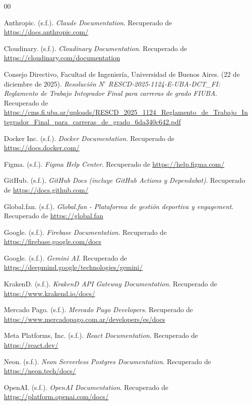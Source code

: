 \documentclass[conference, a4paper]{IEEEtran}
\begin{document}
\begin{thebibliography}{00}

 Anthropic. (s.f.). \textit{Claude Documentation}. Recuperado de \url{https://docs.anthropic.com/}

 Cloudinary. (s.f.). \textit{Cloudinary Documentation}. Recuperado de \url{https://cloudinary.com/documentation}

 Consejo Directivo, Facultad de Ingenier\'ia, Universidad de Buenos Aires. (22 de diciembre de 2025). \textit{Resoluci\'on N$^\circ$ RESCD-2025-1124-E-UBA-DCT\_FI: Reglamento de Trabajo Integrador Final para carreras de grado FIUBA}. Recuperado de \url{https://cms.fi.uba.ar/uploads/RESCD_2025_1124_Reglamento_de_Trabajo_Integrador_Final_para_carreras_de_grado_6da340c642.pdf}

 Docker Inc. (s.f.). \textit{Docker Documentation}. Recuperado de \url{https://docs.docker.com/}

 Figma. (s.f.). \textit{Figma Help Center}. Recuperado de \url{https://help.figma.com/}

 GitHub. (s.f.). \textit{GitHub Docs (incluye GitHub Actions y Dependabot)}. Recuperado de \url{https://docs.github.com/}

 Global.fan. (s.f.). \textit{Global.fan - Plataforma de gesti\'on deportiva y engagement}. Recuperado de \url{https://global.fan}

 Google. (s.f.). \textit{Firebase Documentation}. Recuperado de \url{https://firebase.google.com/docs}

 Google. (s.f.). \textit{Gemini AI}. Recuperado de \url{https://deepmind.google/technologies/gemini/}

 KrakenD. (s.f.). \textit{KrakenD API Gateway Documentation}. Recuperado de \url{https://www.krakend.io/docs/}

 Mercado Pago. (s.f.). \textit{Mercado Pago Developers}. Recuperado de \url{https://www.mercadopago.com.ar/developers/es/docs}

 Meta Platforms, Inc. (s.f.). \textit{React Documentation}. Recuperado de \url{https://react.dev/}

 Neon. (s.f.). \textit{Neon Serverless Postgres Documentation}. Recuperado de \url{https://neon.tech/docs/}

 OpenAI. (s.f.). \textit{OpenAI Documentation}. Recuperado de \url{https://platform.openai.com/docs/}


\end{thebibliography}
\end{document}
